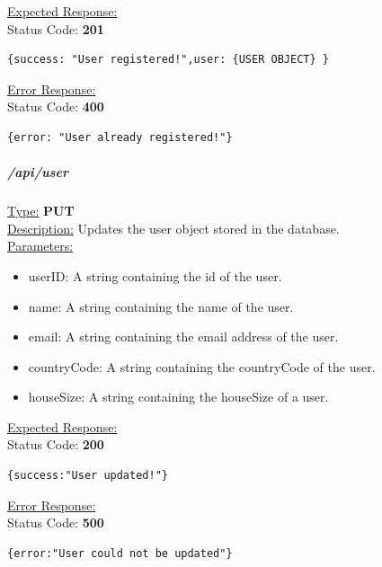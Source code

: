\documentclass[preprint,12pt,3p]{elsarticle}
\newcommand{\forceindent}{\leavevmode{\parindent=1em\indent}}
\begin{document}
\underline{Expected Response:}\\[5pt]
\forceindent Status Code: \textbf{201} \\
\begin{verbatim}
{success: "User registered!",user: {USER OBJECT} }
\end{verbatim}
\underline{Error Response:}\\[5pt]
\forceindent Status Code: \textbf{400} \\
\begin{verbatim}
{error: "User already registered!"}
\end{verbatim}


\subparagraph*{/api/user}
\underline{Type:} \textbf{PUT}\\

\underline{Description:} Updates the user object stored in the database.\\

\underline{Parameters:}
\begin{itemize}
\item userID: A string containing the id of the user.

\item name: A string containing the name of the user.

\item email: A string containing the email address of the user.

\item countryCode: A string containing the countryCode of the user.

\item houseSize: A string containing the houseSize of a user.
\end{itemize}
\underline{Expected Response:}\\[5pt]
\forceindent Status Code: \textbf{200} \\
\begin{verbatim}
{success:"User updated!"}
\end{verbatim}
\underline{Error Response:}\\[5pt]
\forceindent Status Code: \textbf{500} \\
\begin{verbatim}
{error:"User could not be updated"}
\end{verbatim}
\end{document}
